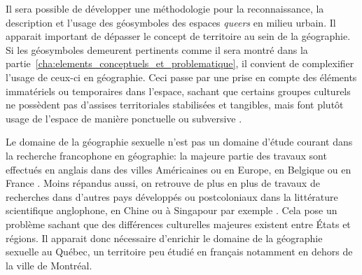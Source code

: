 Il sera possible de développer une méthodologie pour la reconnaissance, la description et l'usage des géosymboles des espaces \emph{queers} en milieu urbain.
Il apparait important de dépasser le concept de territoire au sein de la
géographie.
Si les géosymboles demeurent pertinents comme il sera montré dans la partie~\ref{cha:elements_conceptuels_et_problematique}, il convient de complexifier l'usage de ceux-ci en géographie.
Ceci passe par une prise en compte des éléments immatériels ou temporaires dans l'espace, sachant que certains groupes culturels ne possèdent pas d'assises territoriales stabilisées et tangibles, mais font plutôt usage de l'espace de manière ponctuelle ou subversive \parencite{Talburt2012}.

Le domaine de la géographie sexuelle n'est pas un domaine d'étude courant dans
la recherche francophone en géographie: la majeure partie des travaux sont effectués en anglais dans des villes Américaines ou en Europe, en Belgique ou en France \parencite{Blidon2010,Blidon2006,Cattan2010,Deligne2006}.
Moins répandus aussi, on retrouve de plus en plus de travaux de recherches dans d'autres pays développés ou postcoloniaux dans la littérature scientifique anglophone, en Chine ou à Singapour par exemple \parencite{Oswin2014,Kong2012}.
Cela pose un problème sachant que des différences culturelles majeures existent entre États et régions.
Il apparait donc nécessaire d'enrichir le domaine de la géographie sexuelle au Québec, un territoire peu étudié en français notamment en dehors de la ville de Montréal.
